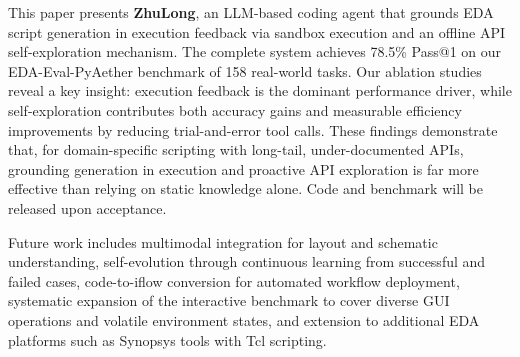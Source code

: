 \documentclass[anonymous, sigconf]{acmart}
\begin{document}
This paper presents \textbf{ZhuLong}, an LLM-based coding agent that grounds EDA script generation in execution feedback via sandbox execution and an offline API self-exploration mechanism. The complete system achieves 78.5\% Pass@1 on our EDA-Eval-PyAether benchmark of 158 real-world tasks. Our ablation studies reveal a key insight: execution feedback is the dominant performance driver, while self-exploration contributes both accuracy gains and measurable efficiency improvements by reducing trial-and-error tool calls. These findings demonstrate that, for domain-specific scripting with long-tail, under-documented APIs, grounding generation in execution and proactive API exploration is far more effective than relying on static knowledge alone. Code and benchmark will be released upon acceptance.

Future work includes multimodal integration for layout and schematic understanding, self-evolution through continuous learning from successful and failed cases, code-to-iflow conversion for automated workflow deployment, systematic expansion of the interactive benchmark to cover diverse GUI operations and volatile environment states, and extension to additional EDA platforms such as Synopsys tools with Tcl scripting.



\end{document}
